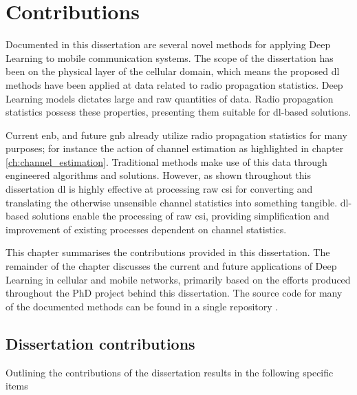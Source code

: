 \chapter{Contributions}\label{ch:contributions}
Documented in this dissertation are several novel methods for applying Deep Learning to mobile communication systems. The scope of the dissertation has been on the physical layer of the cellular domain, which means the proposed \gls{dl} methods have been applied at data related to radio propagation statistics. Deep Learning models dictates large and raw quantities of data. Radio propagation statistics possess these properties, presenting them suitable for \gls{dl}-based solutions. 

Current \acrfull{enb}, and future \gls{gnb} already utilize radio propagation statistics for many purposes; for instance the action of channel estimation as highlighted in chapter \ref{ch:channel_estimation}. Traditional methods make use of this data through engineered algorithms and solutions. However, as shown throughout this dissertation \gls{dl} is highly effective at processing raw \gls{csi} for converting and translating the otherwise unsensible channel statistics into something tangible. \gls{dl}-based solutions enable the processing of raw \gls{csi}, providing simplification and improvement of existing processes dependent on channel statistics.

This chapter summarises the contributions provided in this dissertation. The remainder of the chapter discusses the current and future applications of Deep Learning in cellular and mobile networks, primarily based on the efforts produced throughout the PhD project behind this dissertation. The source code for many of the documented methods can be found in a single repository \cite{Thrane2020RepositoryLearning}.

\section{Dissertation contributions}

Outlining the contributions of the dissertation results in the following specific items

